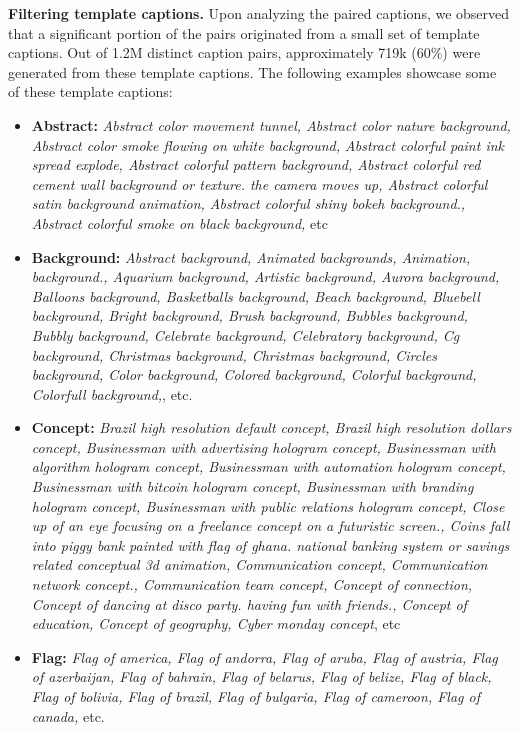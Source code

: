 \noindent\textbf{Filtering template captions.} 
Upon analyzing the paired captions, 
we observed that a significant portion of the pairs originated 
from a small set of template captions. 
Out of 1.2M distinct caption pairs, 
approximately 719k ($60\%$) were generated from these template captions. 
The following examples showcase some of these template captions:

\begin{itemize}
    \item \textbf{Abstract:} \textit{Abstract color movement tunnel, Abstract color nature background, Abstract color smoke flowing on white background, Abstract colorful paint ink spread explode, Abstract colorful pattern background, Abstract colorful red cement wall background or texture. the camera moves up, Abstract colorful satin background animation, Abstract colorful shiny bokeh background., Abstract colorful smoke on black background,} etc
    \item \textbf{Background:} \textit{Abstract background, Animated backgrounds, Animation, background., Aquarium background, Artistic background, Aurora background, Balloons background, Basketballs background, Beach background, Bluebell background, Bright background, Brush background, Bubbles background, Bubbly background, Celebrate background, Celebratory background, Cg background, Christmas background, Christmas background, Circles background, Color background, Colored background, Colorful background, Colorfull background,}, etc.
    \item \textbf{Concept:} \textit{Brazil high resolution default concept, Brazil high resolution dollars concept, Businessman with advertising hologram concept, Businessman with algorithm hologram concept, Businessman with automation hologram concept, Businessman with bitcoin hologram concept, Businessman with branding hologram concept, Businessman with public relations hologram concept, Close up of an eye focusing on a freelance concept on a futuristic screen., Coins fall into piggy bank painted with flag of ghana. national banking system or savings related conceptual 3d animation, Communication concept, Communication network concept., Communication team concept, Concept of connection, Concept of dancing at disco party. having fun with friends., Concept of education, Concept of geography, Cyber monday concept}, etc 
    \item \textbf{Flag:} \textit{Flag of america, Flag of andorra, Flag of aruba, Flag of austria, Flag of azerbaijan, Flag of bahrain, Flag of belarus, Flag of belize, Flag of black, Flag of bolivia, Flag of brazil, Flag of bulgaria, Flag of cameroon, Flag of canada,} etc.
\end{itemize}


